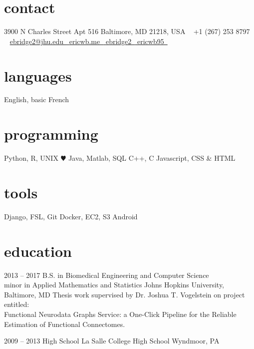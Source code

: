 \documentclass[]{friggeri-cv} %
\begin{document}


\begin{aside} %
\section{contact}
3900 N Charles Street
Apt 516
Baltimore, MD
21218, USA
~
+1 (267) 253 8797~{\color{green} \faMobilePhone}
~
\href{mailto:ebridge2@jhu.edu}{ebridge2@jhu.edu~{\color{red} \faEnvelope}}
\href{http://ericwb.me}{ericwb.me~{\color{brown} \faGlobe}}
\href{http://github.com/ebridge2}{ebridge2~{\color{purple} \faGithub}}
\href{https://www.linkedin.com/im/ericwb95}{ericwb95~{\color{blue} \faLinkedin}}
\section{languages}
English, basic French
\section{programming}
Python, R, UNIX {\color{red} $\varheartsuit$}
Java, Matlab, SQL
C++, C
Javascript, CSS \& HTML
\section{tools}
Django, FSL, Git
Docker, EC2, S3
Android
\end{aside}


\section{education}

\begin{entrylist}


\entry
{2013 -- 2017}
{B.S. {\normalfont in Biomedical Engineering and Computer Science\\ minor in Applied Mathematics and Statistics}}
{Johns Hopkins University, Baltimore, MD}
{Thesis work supervised by Dr. Joshua T. Vogelstein on project entitled: \\Functional Neurodata Graphs Service: a One-Click Pipeline for the Reliable Estimation of Functional Connectomes.}


\entry
{2009 -- 2013}
{High School {\normalfont La Salle College High School}}
{Wyndmoor, PA}

\end{entrylist}
\end{document}
